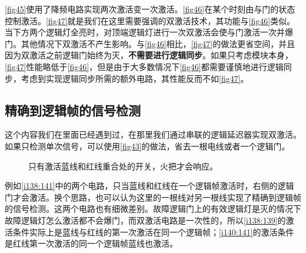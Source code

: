 \autoref{fig45}使用了降频电路实现两次激活变一次激活。\autoref{fig46}在某个时刻由与门的状态控制激活。\autoref{fig47}就是我们在这里需要强调的双激活技术，其功能与\autoref{fig46}类似。当下方两个逻辑灯全亮时，对顶端逻辑灯进行一次双激活会使与门激活一次并爆门。其他情况下双激活不产生影响。与\autoref{fig46}相比，\autoref{fig47}的做法更省空间，并且因为双激活之前逻辑门始终为灭，\textbf{不需要进行逻辑同步}。如果只考虑模块本身，\autoref{fig47}性能略低于\autoref{fig46}，但是由于大多数情况下\autoref{fig46}都需要谨慎地进行逻辑同步，考虑到实现逻辑同步所需的额外电路，其性能反而不如\autoref{fig47}。

\subsection{精确到逻辑帧的信号检测}\label{sec32}
这个内容我们在里面已经遇到过，在那里我们通过串联的逻辑延迟器实现双激活。如果只检测单次信号，可以使用\autoref{fig43}的做法，省去一根电线或者一个逻辑门。

\begin{figure}[!ht]
\begin{center}
\qquad
{}
\end{center}
\caption{只有激活蓝线和红线重合处的开关，火把才会响应。}
\label{i138:141}
\end{figure}

例如\autoref{i138:141}中的两个电路，只当蓝线和红线在一个逻辑帧激活时，右侧的逻辑门才会激活。换个思路，也可以认为这里的一根线对另一根线实现了精确到逻辑帧的信号检测。这两个电路也有细微差别。故障逻辑门上的有效逻辑灯是灭的情况下故障逻辑灯怎么激活都不会爆门，而双激活电路是一次性的，所以\autoref{i138:139}的激活条件实际上是蓝线与红线的第一次激活在同一个逻辑帧；\autoref{i140:141}的激活条件是红线第一次激活的同一个逻辑帧蓝线也激活。

